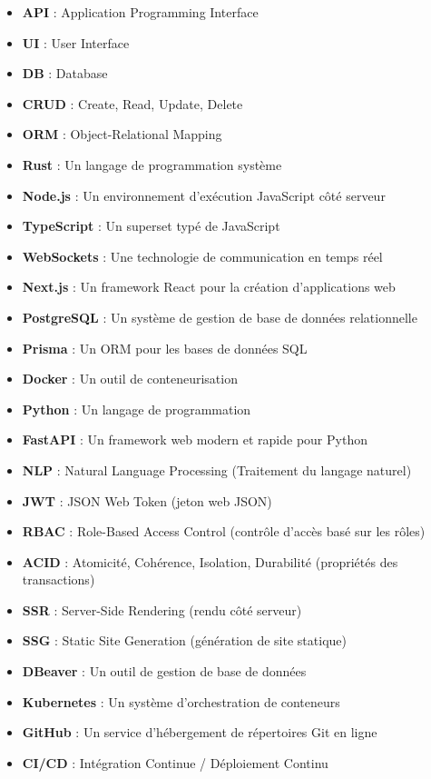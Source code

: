\documentclass[12pt]{rapportPfe}
\begin{document}
	\begin{itemize}
	  \item \textbf{API} : Application Programming Interface
	  \item \textbf{UI} : User Interface
	  \item \textbf{DB} : Database
	  \item \textbf{CRUD} : Create, Read, Update, Delete
	  \item \textbf{ORM} : Object-Relational Mapping
	  \item \textbf{Rust} : Un langage de programmation système
	  \item \textbf{Node.js} : Un environnement d'exécution JavaScript côté serveur
	  \item \textbf{TypeScript} : Un superset typé de JavaScript
	  \item \textbf{WebSockets} : Une technologie de communication en temps réel
	  \item \textbf{Next.js} : Un framework React pour la création d'applications web
	  \item \textbf{PostgreSQL} : Un système de gestion de base de données relationnelle
	  \item \textbf{Prisma} : Un ORM pour les bases de données SQL
	  \item \textbf{Docker} : Un outil de conteneurisation
	  \item \textbf{Python} : Un langage de programmation
	  \item \textbf{FastAPI} : Un framework web modern et rapide pour Python
	  \item \textbf{NLP} : Natural Language Processing (Traitement du langage naturel)
	  \item \textbf{JWT} : JSON Web Token (jeton web JSON)
	  \item \textbf{RBAC} : Role-Based Access Control (contrôle d'accès basé sur les rôles)
	  \item \textbf{ACID} : Atomicité, Cohérence, Isolation, Durabilité (propriétés des transactions)
	  \item \textbf{SSR} : Server-Side Rendering (rendu côté serveur)
	  \item \textbf{SSG} : Static Site Generation (génération de site statique)
	  \item \textbf{DBeaver} : Un outil de gestion de base de données
	  \item \textbf{Kubernetes} : Un système d'orchestration de conteneurs
	  \item \textbf{GitHub} : Un service d'hébergement de répertoires Git en ligne
	  \item \textbf{CI/CD} : Intégration Continue / Déploiement Continu
	\end{itemize}
\end{document}
